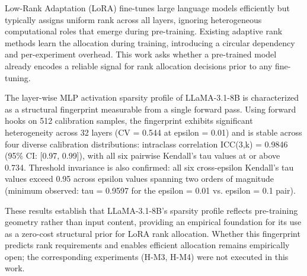 
Low-Rank Adaptation (LoRA) fine-tunes large language models efficiently but typically assigns uniform rank across all layers, ignoring heterogeneous computational roles that emerge during pre-training. Existing adaptive rank methods learn the allocation during training, introducing a circular dependency and per-experiment overhead. This work asks whether a pre-trained model already encodes a reliable signal for rank allocation decisions prior to any fine-tuning.

The layer-wise MLP activation sparsity profile of LLaMA-3.1-8B is characterized as a structural fingerprint measurable from a single forward pass. Using forward hooks on 512 calibration samples, the fingerprint exhibits significant heterogeneity across 32 layers (CV = 0.544 at epsilon = 0.01) and is stable across four diverse calibration distributions: intraclass correlation ICC(3,k) = 0.9846 (95\% CI: [0.97, 0.99]), with all six pairwise Kendall's tau values at or above 0.734. Threshold invariance is also confirmed: all six cross-epsilon Kendall's tau values exceed 0.95 across epsilon values spanning two orders of magnitude (minimum observed: tau = 0.9597 for the epsilon = 0.01 vs. epsilon = 0.1 pair).

These results establish that LLaMA-3.1-8B's sparsity profile reflects pre-training geometry rather than input content, providing an empirical foundation for its use as a zero-cost structural prior for LoRA rank allocation. Whether this fingerprint predicts rank requirements and enables efficient allocation remains empirically open; the corresponding experiments (H-M3, H-M4) were not executed in this work.

